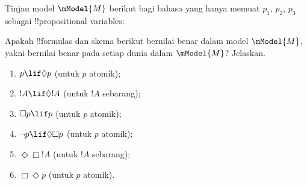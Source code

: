 \documentclass[../../../include/open-logic-section]{subfiles}
\begin{document}
\begin{prob}
  Tinjau model $\mModel{M}$ berikut bagi bahasa yang hanya memuat
  $p_1$, $p_2$, $p_3$ sebagai !!{propositional variable}s:
  \begin{center}
  \end{center}
  Apakah !!{formula}s dan skema berikut bernilai benar dalam model
  $\mModel{M}$, yakni bernilai benar pada setiap dunia dalam $\mModel{M}$?
  Jelaskan.
  \begin{enumerate}
  \item $p\lif \Diamond p$ (untuk $p$ atomik);
  \item $!A\lif \Diamond !A$ (untuk $!A$ sebarang);
  \item $\Box p \lif p$ (untuk $p$ atomik);
  \item $\lnot p \lif \Diamond \Box p$ (untuk $p$ atomik);
  \item $\Diamond \Box !A$ (untuk $!A$ sebarang);
  \item $\Box \Diamond p$ (untuk $p$ atomik). 
  \end{enumerate}
\end{prob}
\end{document}
